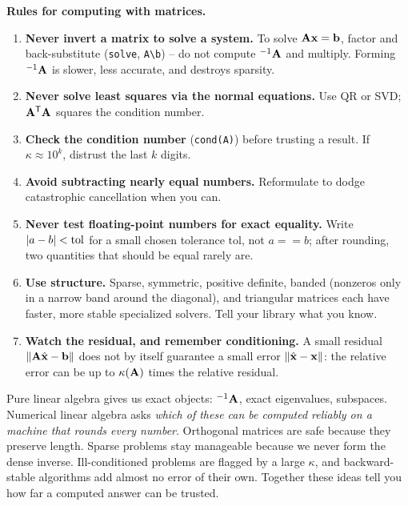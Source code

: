 \begin{focusbox}
\textbf{Rules for computing with matrices.}
\begin{enumerate}
  \item \textbf{Never invert a matrix to solve a system.} To solve $\mathbf{A}\mathbf{x}=
    \mathbf{b}$, factor and back-substitute (\texttt{solve}, \texttt{A\textbackslash b}) --
    do not compute $^{-1}{\mathbf{A}}$ and multiply. Forming $^{-1}{\mathbf{A}}$ is slower, less
    accurate, and destroys sparsity.
  \item \textbf{Never solve least squares via the normal equations.} Use QR or SVD;
    $\mathbf{A}^{\mathsf{T}}\mathbf{A}$ squares the condition number.
  \item \textbf{Check the condition number} (\texttt{cond(A)}) before trusting a
    result. If $\kappa\approx 10^{k}$, distrust the last $k$ digits.
  \item \textbf{Avoid subtracting nearly equal numbers.} Reformulate to dodge
    catastrophic cancellation when you can.
  \item \textbf{Never test floating-point numbers for exact equality.} Write
    $\lvert a-b\rvert < \text{tol}$ for a small chosen tolerance $\text{tol}$, not
    $a == b$; after rounding, two quantities that should be equal rarely are.
  \item \textbf{Use structure.} Sparse, symmetric, positive definite, banded (nonzeros
    only in a narrow band around the diagonal), and triangular matrices each have
    faster, more stable specialized solvers. Tell your library what you know.
  \item \textbf{Watch the residual, and remember conditioning.} A small residual
    $\lVert\mathbf{A}\hat{\mathbf{x}}-\mathbf{b}\rVert$ does not by itself guarantee a small error
    $\lVert\hat{\mathbf{x}}-\mathbf{x}\rVert$: the relative error can be up to $\kappa(\mathbf{A})$
    times the relative residual.
\end{enumerate}
\end{focusbox}

\begin{aestheticbox}
Pure linear algebra gives us exact objects: $^{-1}{\mathbf{A}}$, exact eigenvalues,
subspaces. Numerical linear algebra asks \emph{which of these can be computed reliably
on a machine that rounds every number}. Orthogonal matrices are safe because they
preserve length. Sparse problems stay manageable because we never form the dense
inverse. Ill-conditioned problems are flagged by a large $\kappa$, and backward-stable
algorithms add almost no error of their own. Together these ideas tell you how far a
computed answer can be trusted.
\end{aestheticbox}

